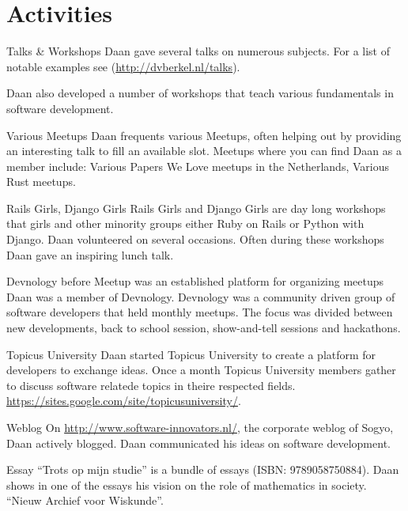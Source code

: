 \section*{Activities}

	\begin{subActivityList}
  \item[Talks & Workshops] Daan gave several talks on numerous
    subjects. For a list of notable examples see
    (\url{http://dvberkel.nl/talks}).

    Daan also developed a number of workshops that teach various fundamentals in
    software development.

    \item[Various Meetups] Daan frequents various Meetups, often helping out by
      providing an interesting talk to fill an available slot. Meetups where you
      can find Daan as a member include: Various Papers We Love meetups in the
      Netherlands, Various Rust meetups.

    \item[Rails Girls, Django Girls] Rails Girls and Django Girls are day long
      workshops that girls and other minority groups either Ruby on Rails or
      Python with Django. Daan volunteered on several occasions. Often during
      these workshops Daan gave an inspiring lunch talk.

    \item[Devnology] before Meetup was an established platform for organizing
      meetups Daan was a member of Devnology. Devnology was a community driven
      group of software developers that held monthly meetups. The focus was
      divided between new developments, back to school session, show-and-tell
      sessions and hackathons.

		\item[Topicus University] Daan started Topicus
                  University to create a platform for developers to
                  exchange ideas. Once a month Topicus University
                  members gather to discuss software relatede topics
                  in theire respected fields. 
		\url{https://sites.google.com/site/topicusuniversity/}.\hfill\\
	
		\item[Weblog] On \url{http://www.software-innovators.nl/}, the corporate
		weblog of Sogyo, Daan actively blogged. Daan
                communicated his ideas on software development.
		\hfill\\
		
		\item[Essay] ``Trots op mijn studie'' is a bundle of
                  essays (ISBN: 9789058750884). Daan shows in one of
                  the essays his vision on the role of mathematics in society.
		``Nieuw Archief voor Wiskunde''.		
		\hfill\\
	\end{subActivityList}
